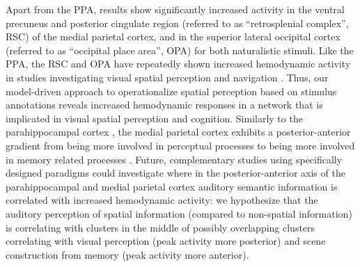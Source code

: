 \documentclass[english,11pt]{article}
\begin{document}
Apart from the PPA, results show significantly increased activity in the ventral
precuneus and posterior cingulate region (referred to as ``retrosplenial
complex'', RSC) of the medial parietal cortex, and in the superior lateral
occipital cortex (referred to as ``occipital place area'', OPA) for both
naturalistic stimuli.
Like the PPA, the RSC and OPA have repeatedly  shown increased hemodynamic
activity in studies investigating visual spatial perception and navigation
\citep{chrastil2018heterogeneity, bettencourt2013role, dilks2013occipital,
epstein2019scene}.
Thus, our model-driven approach to operationalize spatial perception based on
stimulus annotations reveals increased hemodynamic responses in a network that
is implicated in visual spatial perception and cognition.
Similarly to the parahippocampal cortex \citep{aminoff2013role}, the medial
parietal cortex exhibits a posterior-anterior gradient from being more involved
in perceptual processes to being more involved in memory related processes
\citep{chrastil2018heterogeneity, hassabis2009construction, silson2019posterior,
steel2021network}.
Future, complementary studies using specifically designed paradigms could
investigate where in the posterior-anterior axis of the parahippocampal and
medial parietal cortex auditory semantic information is correlated with
increased hemodynamic activity:
we hypothesize that the auditory perception of spatial information (compared to
non-spatial information) is correlating with clusters in the middle of possibly
overlapping clusters correlating with visual perception (peak activity more
posterior) and scene construction from memory (peak activity more anterior).
\end{document}
